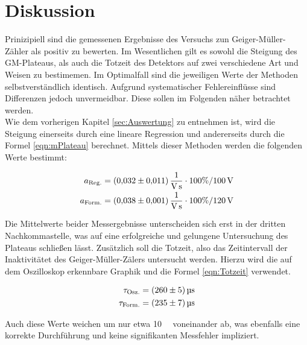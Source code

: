 %

%

\section{Diskussion}
\label{sec:Diskussion}

\noindent Prinizipiell sind die gemessenen Ergebnisse des Versuchs zun Geiger-Müller-Zähler als positiv zu bewerten. Im Wesentlichen 
gilt es sowohl die Steigung des GM-Plateaus, als auch die Totzeit des Detektors auf zwei verschiedene Art und Weisen zu bestimemen. 
Im Optimalfall sind die jeweiligen Werte der Methoden selbstverständlich identisch. Aufgrund systematischer Fehlereinflüsse
sind Differenzen jedoch unvermeidbar. Diese sollen im Folgenden näher betrachtet werden.\\

\noindent Wie dem vorherigen Kapitel \ref{sec:Auswertung} zu entnehmen ist, wird die Steigung einerseits durch eine lineare 
Regression und andererseits durch die Formel \eqref{eqn:mPlateau} berechnet. Mittels dieser Methoden werden die folgenden 
Werte bestimmt:

\begin{align*}
    a_\text{Reg.} &= \qty{0.032\pm0.011}{\per \volt \per \second} \cdot 100\% / \qty{100}{\volt}\\
    a_\text{Form.} &= \qty{0.038\pm0.001}{\per \volt \per \second} \cdot 100\% / \qty{120}{\volt}
\end{align*}

\noindent Die Mittelwerte beider Messergebnisse unterscheiden sich erst in der dritten Nachkommastelle, was auf eine erfolgreiche 
und gelungene Untersuchung des Plateaus schließen lässt. Zusätzlich soll die Totzeit, also das Zeitintervall der Inaktivitätet des 
Geiger-Müller-Zälers untersucht werden. Hierzu wird die auf dem Oszilloskop erkennbare Graphik und die Formel \eqref{eqn:Totzeit}
verwendet.

\begin{align*}
    \tau_\text{Osz.} &= \qty{260\pm5}{\micro \second}\\
    \tau_\text{Form.} &= \qty{235\pm7}{\micro \second}
\end{align*}

\noindent Auch diese Werte weichen um nur etwa \qty{10}{\per\cent} voneinander ab, was ebenfalls eine korrekte Durchführung und keine 
signifikanten Messfehler impliziert.\\

